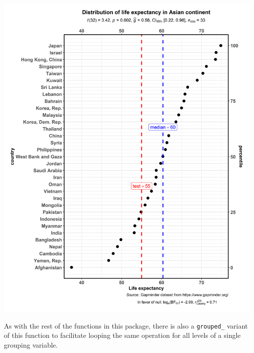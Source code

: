 \documentclass[
]{article}
\begin{document}
\includegraphics[width=1\linewidth]{./figures/paper-ggdotplotstats1-1}

As with the rest of the functions in this package, there is also a \texttt{grouped\_}
variant of this function to facilitate looping the same operation for all levels
of a single grouping variable.
\end{document}
